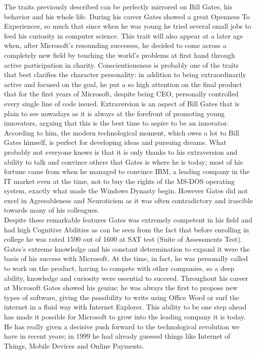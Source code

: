 The traits previously described can be perfectly mirrored on Bill Gates, his behavior and his whole life. During his career Gates showed a great Openness To Experiences, so much that since when he was young he tried several small jobs to feed his curiosity in computer science. This trait will also appear at a later age when, after Microsoft's resounding successes, he decided to come across a completely new field by touching the world's problems at first hand through active participation in charity. Conscientiousness is probably one of the traits that best clarifies the character personality: in addition to being extraordinarily active and focused on the goal, he put a so high attention on the final product that for the first years of Microsoft, despite being CEO, personally controlled every single line of code issued. Extraversion is an aspect of Bill Gates that is plain to see nowadays as it is always at the forefront of promoting young innovators, arguing that this is the best time to aspire to be an innovator.\textsuperscript{\cite{BestMomentInnvators}} According to him, the modern technological moment, which owes a lot to Bill Gates himself, is perfect for developing ideas and pursuing dreams. What probably not everyone knows is that it is only thanks to his extraversion and ability to talk and convince others that Gates is where he is today; most of his fortune came from when he managed to convince IBM, a leading company in the IT market even at the time, not to buy the rights of the MS-DOS operating system, exactly what made the Windows Dynasty begin. However Gates did not excel in Agreeableness and Neuroticism as it was often contradictory and irascible towards many of his colleagues. \\
Despite these remarkable features Gates was extremely competent in his field and had high Cognitive Abilities as can be seen from the fact that before enrolling in college he was rated 1590 out of 1600 at SAT test (Suite of Assessments Test). Gates's extreme knowledge and his constant determination to expand it were the basis of his success with Microsoft. At the time, in fact, he was personally called to work on the product, having to compete with other companies, so a deep ability, knowledge and curiosity were essential to succeed. Throughout his career at Microsoft Gates showed his genius; he was always the first to propose new types of software, giving the possibility to write using Office Word or surf the internet in a fluid way with Internet Explorer. This ability to be one step ahead has made it possible for Microsoft to grow into the leading company it is today. He has really given a decisive push forward to the technological revolution we have in recent years; in 1999 he had already guessed things like Internet of Things, Mobile Devices and Online Payments.\textsuperscript{\cite{Prediction}} \\
